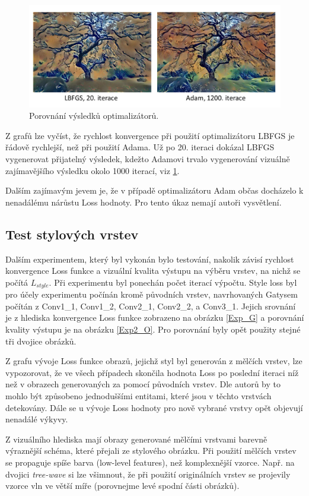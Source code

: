 \documentclass[twocolumn]{article}
\begin{document}
	\begin{figure}[h]
		\includegraphics[width=\linewidth]{LBFGS_ADAM_iterace.png}
		\caption{Porovnání výsledků optimalizátorů. }
		\label{Exp1O}
	\end{figure}
	
	

	Z grafů lze vyčíst, že rychlost konvergence při použití optimalizátoru LBFGS je řádově rychlejší, než při použití Adama. Už po 20. iteraci dokázal LBFGS vygenerovat přijatelný výsledek, kdežto Adamovi trvalo vygenerování vizuálně zajímavějšího výsledku okolo 1000 iterací, viz \ref{Exp1O}.

	 Dalším zajímavým jevem je, že v případě optimalizátoru Adam občas docházelo k nenadálému nárůstu Loss hodnoty. Pro tento úkaz nemají autoři vysvětlení.
	
	\subsection*{Test stylových vrstev}
	Dalším experimentem, který byl vykonán bylo testování, nakolik závisí rychlost konvergence Loss funkce a vizuální kvalita výstupu na výběru vrstev, na nichž se počítá $L_{style}$. Při experimentu byl ponechán počet iterací výpočtu. Style loss byl pro účely experimentu počínán kromě původních vrstev, navrhovaných Gatysem počítán z Conv1\_1, Conv1\_2, Conv2\_1, Conv2\_2, a Conv3\_1.
	Jejich srovnání je z hlediska konvergence Loss funkce zobrazeno na obrázku \ref{Exp_G} a porovnání kvality výstupu je na obrázku \ref{Exp2_O}. Pro porovnání byly opět použity stejné tři dvojice obrázků.
	\par
	Z grafu vývoje Loss funkce obrazů, jejichž styl byl generován z mělčích vrstev, lze vypozorovat, že ve všech případech skončila hodnota Loss po poslední iteraci níž než v obrazech generovaných za pomocí původních vrstev. Dle autorů by to mohlo být způsobeno jednoduššími entitami, které jsou v těchto vrstvách detekovány. Dále se u vývoje Loss hodnoty pro nově vybrané vrstvy opět objevují nenadálé výkyvy. 
	\par
	Z vizuálního hlediska mají obrazy generované mělčími vrstvami barevně výraznější schéma, které přejali ze stylového obrázku. Při použití mělčích vrstev se propaguje spíše barva (low-level features), než komplexnější vzorce. Např. na dvojici \textit{tree-wave} si lze všimnout, že při použití originálních vrstev se projevily vzorce vln ve větší míře (porovnejme levé spodní části obrázků). 
	
\end{document}
